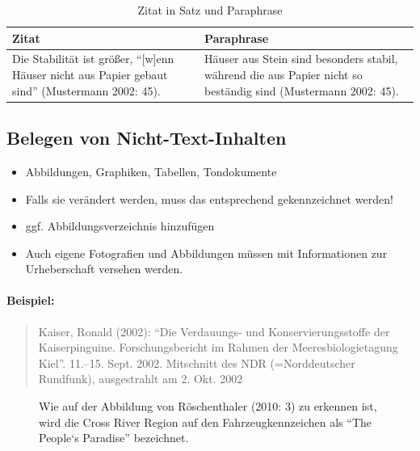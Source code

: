 \documentclass[ 12pt,
                titlepage,
                parskip=half,
                version=first,
                bibliography=totocnumbered,
                final,
                listof=totoc]{scrartcl}
\begin{document}
\begin{table}[h]
\centering
\begin{tabular}{ll}
\toprule
\textbf{Zitat} & \textbf{Paraphrase}\\
\midrule
\parbox[t]{0.4\linewidth}{Die Stabilität ist größer, \enquote{[w]enn Häuser
nicht aus Papier gebaut sind} (Mustermann 2002: 45).} &
\parbox[t]{0.4\linewidth}{Häuser aus Stein sind besonders stabil, während die
aus Papier nicht so beständig sind (Mustermann 2002: 45).}\\
\bottomrule
\end{tabular}
\caption{Zitat in Satz und Paraphrase}
\end{table}

\subsection{Belegen von Nicht-Text-Inhalten}

\begin{itemize}
    \item Abbildungen, Graphiken, Tabellen, Tondokumente
    \item Falls sie verändert werden, muss das entsprechend gekennzeichnet
    werden!
    \item ggf. Abbildungsverzeichnis hinzufügen
    \item Auch eigene Fotografien und Abbildungen müssen mit Informationen zur
    Urheberschaft versehen werden.
\end{itemize}

\paragraph{Beispiel:}
\begin{quote}
Kaiser, Ronald (2002): \enquote{Die Verdauungs- und Konservierungsstoffe der
Kaiserpinguine. Forschungsbericht im Rahmen der Meeresbiologietagung Kiel}.
11.--15. Sept. 2002. Mitschnitt des NDR (=Norddeutscher Rundfunk), ausgestrahlt
am 2. Okt. 2002
\end{quote}

\begin{figure}[ht!]
\centering
{}
\caption[Beispiel einer Abbildung]{Wie auf der Abbildung von Röschenthaler
(2010: 3) zu erkennen ist, wird die Cross River Region auf den
Fahrzeugkennzeichen als \enquote{The People‘s Paradise} bezeichnet.}
\label{img:grafik1}
\end{figure}
\end{document}
